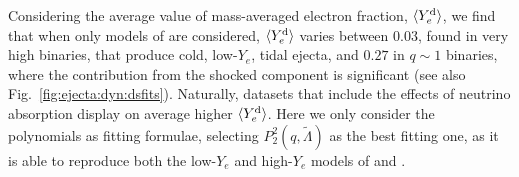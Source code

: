 Considering the average value of mass-averaged electron fraction, $\langle Y^{\text{d}}_{e}\rangle$, we find 
that when only models of \DSrefset{} are considered, $\langle Y^{\text{d}}_{e}\rangle$ varies 
between $0.03$, found in very high \mr{} binaries, that produce cold, low-$Y_e$,
tidal ejecta, and $0.27$ in $q\sim1$  %
binaries, where the contribution from the shocked component is significant 
(see also Fig.~\ref{fig:ejecta:dyn:dsfits}). 
%
Naturally, datasets that include the effects of neutrino absorption display 
on average higher $\langle Y^{\text{d}}_{e}\rangle$. 
%
Here we only consider the polynomials as fitting formulae, 
selecting $P_2^2(q,\tilde\Lambda)$ as the best fitting one, as it is able to 
reproduce both the low-$Y_e$ and high-$Y_e$ models of \DSheatcool{} and \DSrefset{}.

